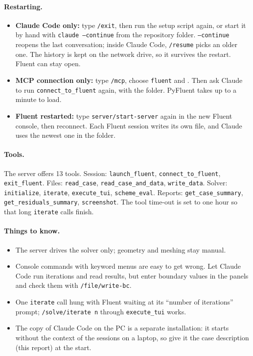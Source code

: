 \paragraph{Restarting.}
\begin{itemize}
\item \textbf{Claude Code only:} type \texttt{/exit}, then run the setup script again, or start it by hand
with \texttt{claude --continue} from the repository folder. \texttt{--continue} reopens the last
conversation; inside Claude Code, \texttt{/resume} picks an older one. The history is kept on the network
drive, so it survives the restart. Fluent can stay open.
\item \textbf{MCP connection only:} type \texttt{/mcp}, choose \texttt{fluent} and .
Then ask Claude to run \texttt{connect\_to\_fluent} again, with the  folder. PyFluent takes up to a
minute to load.
\item \textbf{Fluent restarted:} type \texttt{server/start-server} again in the new Fluent console, then
reconnect. Each Fluent session writes its own  file, and Claude uses the newest one in
the folder.
\end{itemize}

\paragraph{Tools.} The server offers 13 tools. Session: \texttt{launch\_fluent},
\texttt{connect\_to\_fluent}, \texttt{exit\_fluent}. Files: \texttt{read\_case},
\texttt{read\_case\_and\_data}, \texttt{write\_data}. Solver: \texttt{initialize}, \texttt{iterate},
\texttt{execute\_tui}, \texttt{scheme\_eval}. Reports: \texttt{get\_case\_summary},
\texttt{get\_residuals\_summary}, \texttt{screenshot}. The tool time-out is set to one hour so that
long \texttt{iterate} calls finish.

\paragraph{Things to know.}
\begin{itemize}
\item The server drives the solver only; geometry and meshing stay manual.
\item Console commands with keyword menus are easy to get wrong. Let Claude Code run iterations and read
results, but enter boundary values in the panels and check them with \texttt{/file/write-bc}.
\item One \texttt{iterate} call hung with Fluent waiting at its ``number of iterations'' prompt;
\texttt{/solve/iterate n} through \texttt{execute\_tui} works.
\item The copy of Claude Code on the PC is a separate installation: it starts without the context of
the sessions on a laptop, so give it the case description (this report) at the start.
\end{itemize}
